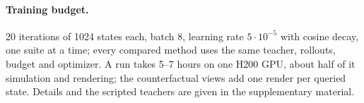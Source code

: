 \paragraph{Training budget.}
20 iterations of 1024 states each, batch 8, learning rate $5\cdot10^{-5}$ with cosine decay, one suite at a time; every
compared method uses the same teacher, rollouts, budget and optimizer. A run takes 5--7 hours on one H200 GPU, about half
of it simulation and rendering; the counterfactual views add one render per queried state.
Details and the scripted teachers are given in the supplementary material.
